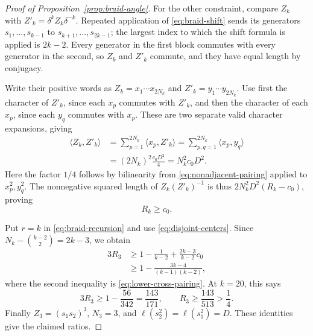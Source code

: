 \begin{proof}[Proof of Proposition~\ref{prop:braid-angle}]
For the other constraint, compare $Z_k$ with
$Z'_k=\delta^k Z_k\delta^{-k}$.  Repeated application of
\eqref{eq:braid-shift} sends its generators $s_1,\ldots,s_{k-1}$ to
$s_{k+1},\ldots,s_{2k-1}$; the largest index to which the shift formula
is applied is $2k-2$.  Every generator in the first block commutes with
every generator in the second, so $Z_k$ and $Z'_k$ commute, and they have
equal length by conjugacy.

Write their positive words as $Z_k=x_1\cdots x_{2N_k}$ and
$Z'_k=y_1\cdots y_{2N_k}$.  Use first the character of $Z'_k$, since
each $x_p$ commutes with $Z'_k$, and then the character of each $x_p$,
since each $y_q$ commutes with $x_p$.  These are two separate valid
character expansions, giving
\begin{align*}
 \langle Z_k,Z'_k\rangle
 &=\sum_{p=1}^{2N_k}\langle x_p,Z'_k\rangle
   =\sum_{p,q=1}^{2N_k}\langle x_p,y_q\rangle\\
 &= (2N_k)^2\frac{c_0D^2}{4}=N_k^2c_0D^2.
\end{align*}
Here the factor $1/4$ follows by bilinearity from
\eqref{eq:nonadjacent-pairing} applied to $x_p^2,y_q^2$.
The nonnegative squared length of $Z_k(Z'_k)^{-1}$ is thus
$2N_k^2D^2(R_k-c_0)$, proving
\begin{equation}\label{eq:disjoint-centers}
 R_k\ge c_0.
\end{equation}

Put $r=k$ in \eqref{eq:braid-recursion} and use
\eqref{eq:disjoint-centers}.  Since
$N_k-\binom{k-2}{2}=2k-3$, we obtain
\begin{align*}
 3R_3
 &\ge 1-\frac1{k-2}+\frac{2k-3}{k-2}c_0\\
 &\ge 1-\frac{3k-4}{(k-1)(k-2)},
\end{align*}
where the second inequality is \eqref{eq:lower-cross-pairing}.
At $k=20$, this says
\[
 3R_3\ge 1-\frac{56}{342}=\frac{143}{171},\qquad
 R_3\ge\frac{143}{513}>\frac14.
\]
Finally $Z_3=(s_1s_2)^3$, $N_3=3$, and
$\ell(s_2^2)=\ell(s_1^2)=D$.  These identities give the claimed ratios.
\end{proof}
